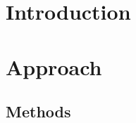 \documentclass{bioinfo}
\begin{document}
\section{Introduction}







\section{Approach}

\begin{methods}
\section{Methods}
\end{methods}
\end{document}

